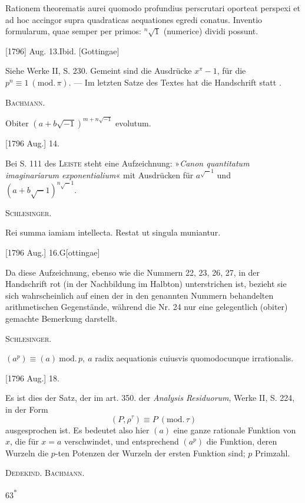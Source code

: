 \clearpage{}
\indent Rationem theorematis aurei quomodo profundius perscrutari oporteat perspexi et ad hoc accingor supra quadraticas aequationes egredi conatus. Inventio formularum, quae semper per primos: \({}^{n}\!\surd1\) (numerice) dividi possunt.
\par\noindent\hfill[1796] Aug. 13.\quad Ibid. [Gottingae]

\medskip\begingroup\small
\indent Siehe Werke II, S. 230. Gemeint sind die Ausdrücke \(x^\pi-1\), für die \(p^n\equiv1\ (\mathrm{mod.}\,\pi)\). — Im letzten Satze des Textes hat die Handschrift  statt .
\par\noindent\hfill\textsc{Bachmann.}
\par\endgroup

\indent Obiter \((a+b\sqrt{-1})^{m+n\sqrt{-1}}\) evolutum.
\par\noindent\hfill[1796 Aug.] 14.

\medskip\begingroup\small
\indent Bei S. 111 des \textsc{Leiste} steht eine Aufzeichnung: »\textit{Canon quantitatum imaginariarum exponentialium}« mit Ausdrücken für \(a^{\surd-1}\) und \((a+b\surd-1)^{n\surd-1}\).
\par\noindent\hfill\textsc{Schlesinger.}
\par\endgroup

\indent Rei summa iamiam intellecta. Restat ut singula muniantur.
\par\noindent\hfill[1796 Aug.] 16.\quad G[ottingae]

\medskip\begingroup\small
\indent Da diese Aufzeichnung, ebenso wie die Nummern 22, 23, 26, 27, in der Handschrift rot (in der Nachbildung im Halbton) unterstrichen ist, bezieht sie sich wahrscheinlich auf einen der in den genannten Nummern behandelten arithmetischen Gegenstände, während die Nr. 24 nur eine gelegentlich (obiter) gemachte Bemerkung darstellt.
\par\noindent\hfill\textsc{Schlesinger.}
\par\endgroup

\indent \((a^p)\equiv(a)\ \mathrm{mod.}\,p,\ a\) radix aequationis cuiusvis quomodocunque irrationalis.
\par\noindent\hfill[1796 Aug.] 18.\quad [Gottingae]

\medskip\begingroup\small
\indent Es ist dies der Satz, der im art. 350. der \textit{Analysis Residuorum}, Werke II, S. 224, in der Form
\[
(P,\rho^\tau)\equiv P\ (\mathrm{mod.}\,\tau)
\]
\noindent ausgesprochen ist. Es bedeutet also hier \((a)\) eine ganze rationale Funktion von \(x\), die für \(x=a\) verschwindet, und entsprechend \((a^p)\) die Funktion, deren Wurzeln die \(p\)-ten Potenzen der Wurzeln der ersten Funktion sind; \(p\) Primzahl.
\par\noindent\hfill\textsc{Dedekind. Bachmann.}
\par\endgroup
\par\smallskip\noindent\hfill 63\textsuperscript{*}

